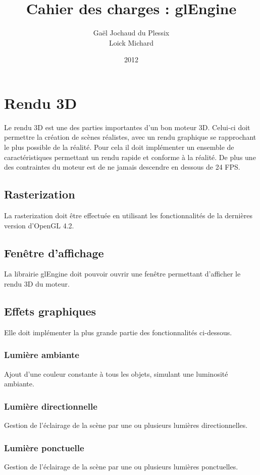 \documentclass [a4 paper,11pt]{article}
\title {Cahier des charges : glEngine}
\author {Gaël Jochaud du Plessix\\
Loick Michard}
\date {2012}
\begin{document}
\maketitle

\section{Rendu 3D}

Le rendu 3D est une des parties importantes d'un bon moteur 3D.
Celui-ci doit permettre la création de scènes réalistes, avec un rendu graphique se rapprochant le plus possible de la réalité.
Pour cela il doit implémenter un ensemble de caractéristiques permettant un rendu rapide et conforme à la réalité.
De plus une des contraintes du moteur est de ne jamais descendre en dessous de 24 FPS.

\subsection{Rasterization}
La rasterization doit être effectuée en utilisant les fonctionnalités de la dernières version d'OpenGL 4.2.

\subsection{Fenêtre d'affichage}
La librairie glEngine doit pouvoir ouvrir une fenêtre permettant d'afficher le rendu 3D du moteur.

\subsection{Effets graphiques}

Elle doit implémenter la plus grande partie des fonctionnalités ci-dessous.

\subsubsection*{Lumière ambiante}
Ajout d'une couleur constante à tous les objets, simulant une luminosité ambiante.
\subsubsection*{Lumière directionnelle}
Gestion de l'éclairage de la scène par une ou plusieurs lumières directionnelles.
\subsubsection*{Lumière ponctuelle}
Gestion de l'éclairage de la scène par une ou plusieurs lumières ponctuelles.
\end{document}
